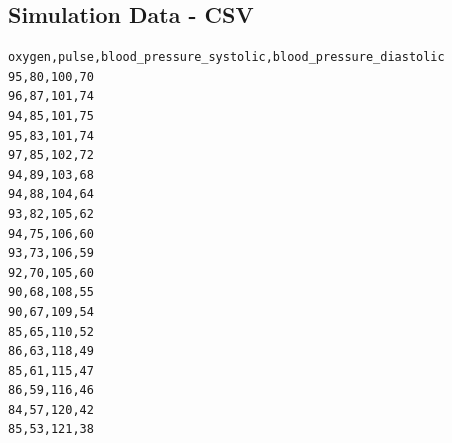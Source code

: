 \documentclass[a4paper]{article}
\newcommand{\arraystrechlength}{1.5}
\begin{document}
\clearpage
\subsection{Simulation Data - CSV}
\label{appendix:simulation-csv}
\begin{lstlisting}[caption=CSV example, captionpos=b]
oxygen,pulse,blood_pressure_systolic,blood_pressure_diastolic
95,80,100,70
96,87,101,74
94,85,101,75
95,83,101,74
97,85,102,72
94,89,103,68
94,88,104,64
93,82,105,62
94,75,106,60
93,73,106,59
92,70,105,60
90,68,108,55
90,67,109,54
85,65,110,52
86,63,118,49
85,61,115,47
86,59,116,46
84,57,120,42
85,53,121,38
\end{lstlisting}





\clearpage

\end{document}
